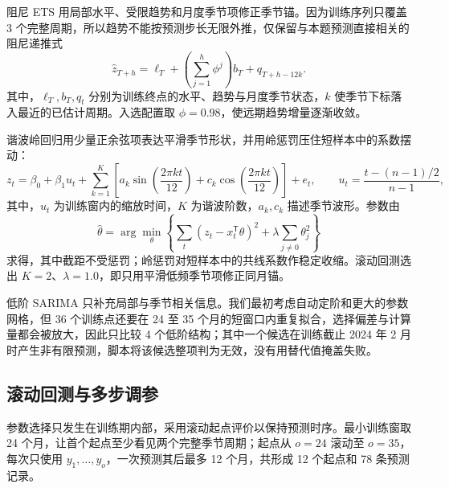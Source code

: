 阻尼 ETS 用局部水平、受限趋势和月度季节项修正季节锚\cite{gardner1985trends}。因为训练序列只覆盖 3 个完整周期，所以趋势不能按预测步长无限外推，仅保留与本题预测直接相关的阻尼递推式%
\begin{equation}
    \widehat z_{T+h}=\ell_T+\left(\sum_{j=1}^{h}\phi^j\right)b_T+q_{T+h-12k}.
\end{equation} %
其中，$\ell_T,b_T,q_t$ 分别为训练终点的水平、趋势与月度季节状态，$k$ 使季节下标落入最近的已估计周期。入选配置取 $\phi=0.98$，使远期趋势增量逐渐收敛。%

谐波岭回归用少量正余弦项表达平滑季节形状，并用岭惩罚压住短样本中的系数摆动：
\begin{equation}
    z_t=\beta_0+\beta_1u_t+
    \sum_{k=1}^{K}\left[a_k\sin\left(\frac{2\pi kt}{12}\right)
    +c_k\cos\left(\frac{2\pi kt}{12}\right)\right]+e_t,
    \qquad u_t=\frac{t-(n-1)/2}{n-1},
\end{equation}
其中，$u_t$ 为训练窗内的缩放时间，$K$ 为谐波阶数，$a_k,c_k$ 描述季节波形。参数由
\begin{equation}
    \widehat\theta=\arg\min_{\theta}
    \left\{\sum_t(z_t-x_t^{\mathsf T}\theta)^2
    +\lambda\sum_{j\ne 0}\theta_j^2\right\}
\end{equation}
求得，其中截距不受惩罚；岭惩罚对短样本中的共线系数作稳定收缩\cite{hoerl1970ridge}。滚动回测选出 $K=2$、$\lambda=1.0$，即只用平滑低频季节项修正同月锚。%

低阶 SARIMA 只补充局部与季节相关信息\cite{hyndman2021forecasting}。我们最初考虑自动定阶和更大的参数网格，但 36 个训练点还要在 24 至 35 个月的短窗口内重复拟合，选择偏差与计算量都会被放大，因此只比较 4 个低阶结构；其中一个候选在训练截止 2024 年 2 月时产生非有限预测，脚本将该候选整项判为无效，没有用替代值掩盖失败。%

\subsection{滚动回测与多步调参}

参数选择只发生在训练期内部，采用滚动起点评价以保持预测时序\cite{hyndman2021forecasting}。最小训练窗取 24 个月，让首个起点至少看见两个完整季节周期；起点从 $o=24$ 滚动至 $o=35$，每次只使用 $y_1,\ldots,y_o$，一次预测其后最多 12 个月，共形成 12 个起点和 78 条预测记录。%

